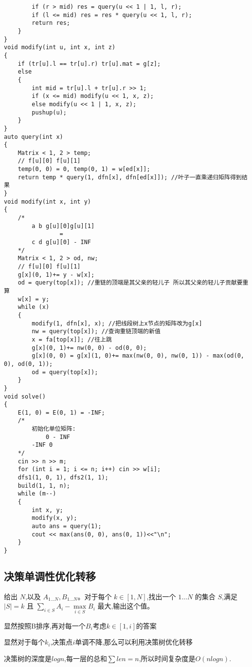 \documentclass[a4paper,fontset=none]{ctexart}
\begin{document}
\begin{verbatim}
        if (r > mid) res = query(u << 1 | 1, l, r);
        if (l <= mid) res = res * query(u << 1, l, r);
        return res;
    }
}
void modify(int u, int x, int z)
{
    if (tr[u].l == tr[u].r) tr[u].mat = g[z];
    else
    {
        int mid = tr[u].l + tr[u].r >> 1;
        if (x <= mid) modify(u << 1, x, z);
        else modify(u << 1 | 1, x, z);
        pushup(u);
    }
}
auto query(int x)
{
    Matrix < 1, 2 > temp;
    // f[u][0] f[u][1]
    temp(0, 0) = 0, temp(0, 1) = w[ed[x]];
    return temp * query(1, dfn[x], dfn[ed[x]]); //叶子一直乘递归矩阵得到结果
}
void modify(int x, int y)
{
    /*
        a b g[u][0]g[u][1]
                =
        c d g[u][0] - INF
    */
    Matrix < 1, 2 > od, nw;
    // f[u][0] f[u][1]
    g[x](0, 1)+= y - w[x];
    od = query(top[x]); //重链的顶端是其父亲的轻儿子 所以其父亲的轻儿子贡献要重算
    w[x] = y;
    while (x)
    {
        modify(1, dfn[x], x); //把线段树上x节点的矩阵改为g[x]
        nw = query(top[x]); //查询重链顶端的新值
        x = fa[top[x]]; //往上跳
        g[x](0, 1)+= nw(0, 0) - od(0, 0);
        g[x](0, 0) = g[x](1, 0)+= max(nw(0, 0), nw(0, 1)) - max(od(0, 0), od(0, 1));
        od = query(top[x]);
    }
}
void solve()
{
    E(1, 0) = E(0, 1) = -INF;
    /*
        初始化单位矩阵:
            0 - INF
        -INF 0
    */
    cin >> n >> m;
    for (int i = 1; i <= n; i++) cin >> w[i];
    dfs1(1, 0, 1), dfs2(1, 1);
    build(1, 1, n);
    while (m--)
    {
        int x, y;
        modify(x, y);
        auto ans = query(1);
        cout << max(ans(0, 0), ans(0, 1))<<"\n";
    }
}
\end{verbatim}
\subsection{决策单调性优化转移}

给出 $N$,以及 $A_{1...N},B_{1...N}$。对于每个 $k\in [1,N]$,找出一个 $1...N$ 的集合 $S$,满足 $|S|=k$ 且 $\sum\limits_{i\in S}A_i-\max\limits_{i\in S}B_i$ 最大,输出这个值。

显然按照B排序,再对每一个$B_i$考虑$k\in [1,i]$的答案

显然对于每个$k_i$,决策点$i$单调不降,那么可以利用决策树优化转移

决策树的深度是$logn$,每一层的总和$\sum len=n$,所以时间复杂度是$O(nlogn)$.
\end{document}
